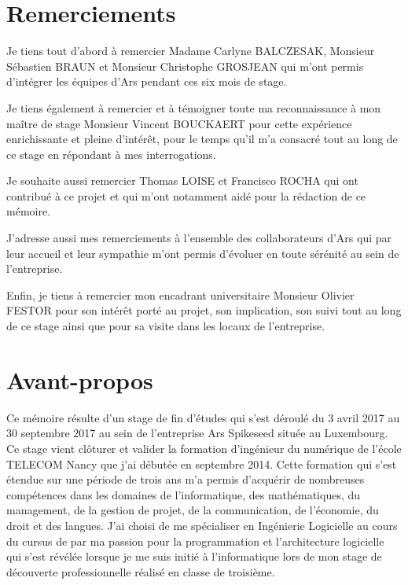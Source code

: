 \documentclass{tnreport}
\begin{document}
  
\maketitle
{}


\cleardoublepage

\makesecondtitle

\section*{Remerciements}

Je tiens tout d'abord à remercier Madame Carlyne BALCZESAK, Monsieur Sébastien BRAUN et Monsieur Christophe GROSJEAN qui m'ont permis d'intégrer les équipes d'Ar{\texteta}s pendant ces six mois de stage. 

Je tiens également à remercier et à témoigner toute ma reconnaissance à mon maître de stage Monsieur Vincent BOUCKAERT pour cette expérience enrichissante et pleine d’intérêt, pour le temps qu’il m'a consacré tout au long de ce stage en répondant à mes interrogations. 

Je souhaite aussi remercier Thomas LOISE et Francisco ROCHA qui ont contribué à ce projet et qui m'ont notamment aidé pour la rédaction de ce mémoire. 

J'adresse aussi mes remerciements à l'ensemble des collaborateurs d'Ar{\texteta}s qui par leur accueil et leur sympathie m'ont permis d'évoluer en toute sérénité au sein de l'entreprise. 

Enfin, je tiens à remercier mon encadrant universitaire Monsieur Olivier FESTOR pour son intérêt porté au projet, son implication, son suivi tout au long de ce stage ainsi que pour sa visite dans les locaux de l'entreprise.

\cleardoublepage

\section*{Avant-propos}

Ce mémoire résulte d'un stage de fin d'études qui s'est déroulé du 3 avril 2017 au 30 septembre 2017 au sein de l'entreprise Ar{\texteta}s Spikeseed située au Luxembourg. Ce stage vient clôturer et valider la formation d'ingénieur du numérique de l'école TELECOM Nancy que j'ai débutée en septembre 2014. Cette formation qui s'est étendue sur une période de trois ans m'a permis d'acquérir de nombreuses compétences dans les domaines de l'informatique, des mathématiques, du management, de la gestion de projet, de la communication, de l'économie, du droit et des langues. J'ai choisi de me spécialiser en Ingénierie Logicielle au cours du cursus de par ma passion pour la programmation et l'architecture logicielle qui s'est révélée lorsque je me suis initié à l'informatique lors de mon stage de découverte professionnelle réalisé en classe de troisième.
\end{document}
